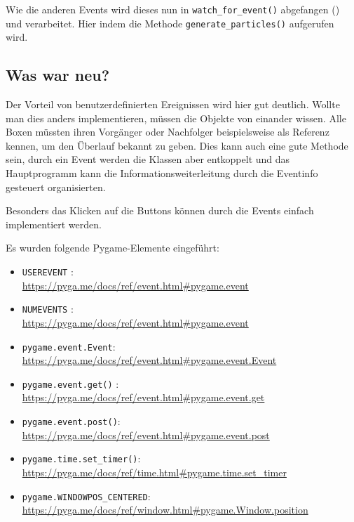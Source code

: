 Wie die anderen Events wird dieses nun in \texttt{watch\_for\_event()} abgefangen () und verarbeitet. Hier indem die Methode \texttt{generate\_particles()} aufgerufen wird.


\subsection*{Was war neu?}

Der Vorteil von benutzerdefinierten Ereignissen wird hier gut deutlich. Wollte man dies anders implementieren, müssen die Objekte von einander wissen. Alle Boxen müssten ihren Vorgänger oder Nachfolger beispielsweise als Referenz kennen, um den Überlauf bekannt zu geben. Dies kann auch eine gute Methode sein, durch ein Event werden die Klassen aber entkoppelt und das Hauptprogramm kann die Informationsweiterleitung durch die Eventinfo gesteuert organisierten.

Besonders das Klicken auf die Buttons können durch die Events einfach implementiert werden.


Es wurden folgende Pygame-Elemente eingeführt:

\begin{itemize}
	\item \texttt{USEREVENT}
    :\\
    \url{https://pyga.me/docs/ref/event.html#pygame.event}

    \item \texttt{NUMEVENTS}
    :\\
    \url{https://pyga.me/docs/ref/event.html#pygame.event}

	\item \texttt{pygame.event.Event}:
	\\
	\url{https://pyga.me/docs/ref/event.html#pygame.event.Event}
	
	\item \texttt{pygame.event.get()}
    :\\
    \url{https://pyga.me/docs/ref/event.html#pygame.event.get}

	\item \texttt{pygame.event.post()}:
	\\
	\url{https://pyga.me/docs/ref/event.html#pygame.event.post}
	
	\item \texttt{pygame.time.set\_timer()}:
	\\
	\url{https://pyga.me/docs/ref/time.html#pygame.time.set_timer}

	\item \texttt{pygame.WINDOWPOS\_CENTERED}:
	\\
	\url{https://pyga.me/docs/ref/window.html#pygame.Window.position}

	
\end{itemize}


